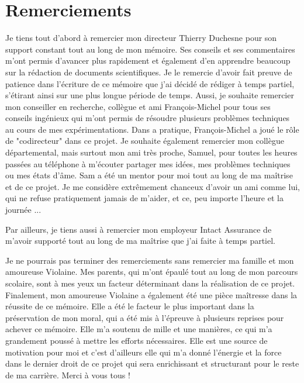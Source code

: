 \chapter*{Remerciements}        %
\label{chap:remerciements}      %

Je tiens tout d'abord à remercier mon directeur Thierry Duchesne pour son support constant tout au long de mon mémoire. Ses conseils et ses commentaires m'ont permis d'avancer plus rapidement et également d'en apprendre beaucoup sur la rédaction de documents scientifiques. Je le remercie d'avoir fait preuve de patience dans l'écriture de ce mémoire que j'ai décidé de rédiger à temps partiel, s'étirant ainsi sur une plus longue période de temps. Aussi, je souhaite remercier mon conseiller en recherche, collègue et ami François-Michel pour tous ses conseils ingénieux qui m'ont permis de résoudre plusieurs problèmes techniques au cours de mes expérimentations. Dans a pratique, François-Michel a joué le rôle de "codirecteur" dans ce projet. Je souhaite également remercier mon collègue départemental, mais surtout mon ami très proche, Samuel, pour toutes les heures passées au téléphone à m'écouter partager mes idées, mes problèmes techniques ou mes états d'âme. Sam a été un mentor pour moi tout au long de ma maîtrise et de ce projet. Je me considère extrêmement chanceux d'avoir un ami comme lui, qui ne refuse pratiquement jamais de m'aider, et ce, peu importe l'heure et la journée ... 

Par ailleurs, je tiens aussi à remercier mon employeur Intact Assurance de m'avoir supporté tout au long de ma maîtrise que j'ai faite à temps partiel.

Je ne pourrais pas terminer des remerciements sans remercier ma famille et mon amoureuse Violaine. Mes parents, qui m'ont épaulé tout au long de mon parcours scolaire, sont à mes yeux un facteur déterminant dans la réalisation de ce projet. Finalement, mon amoureuse Violaine a également été une pièce maîtresse dans la réussite de ce mémoire. Elle a été le facteur le plus important dans la préservation de mon moral, qui a été mis à l'épreuve à plusieurs reprises pour achever ce mémoire. Elle m'a soutenu de mille et une manières, ce qui m'a grandement poussé à mettre les efforts nécessaires. Elle est une source de motivation pour moi et c'est d'ailleurs elle qui m'a donné l'énergie et la force dans le dernier droit de ce projet qui sera enrichissant et structurant pour le reste de ma carrière. Merci à vous tous ! 

